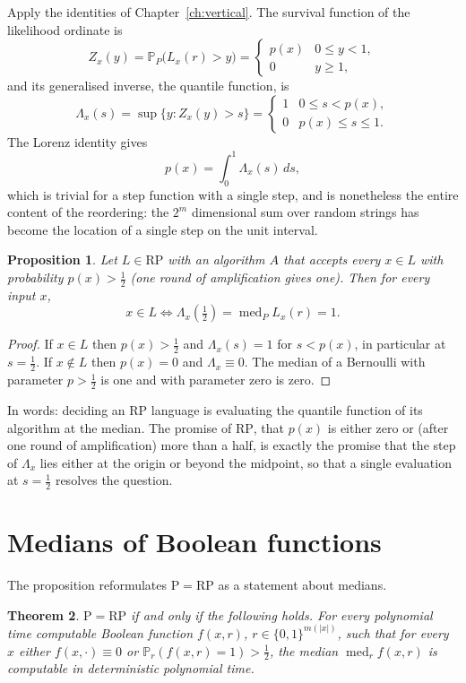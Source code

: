 \documentclass[11pt,twoside,openany]{book}
\theoremstyle{plain}
\newtheorem{theorem}{Theorem}[chapter]
\newtheorem{proposition}[theorem]{Proposition}
\theoremstyle{definition}
\theoremstyle{remark}
\newcommand{\PP}{\mathbb{P}}
\newcommand{\RP}{\mathrm{RP}}
\newcommand{\Pc}{\mathrm{P}}
\begin{document}
Apply the identities of Chapter~\ref{ch:vertical}. The survival function of the likelihood ordinate is
\[
Z_x(y) = \PP_P\big( L_x(r) > y \big) =
\begin{cases}
p(x) & 0 \le y < 1, \\
0 & y \ge 1,
\end{cases}
\]
and its generalised inverse, the quantile function, is
\[
\Lambda_x(s) = \sup\{ y : Z_x(y) > s \} =
\begin{cases}
1 & 0 \le s < p(x), \\
0 & p(x) \le s \le 1 .
\end{cases}
\]
The Lorenz identity gives
\[
p(x) = \int_0^1 \Lambda_x(s) \, ds ,
\]
which is trivial for a step function with a single step, and is nonetheless the entire content of the reordering: the $2^m$ dimensional sum over random strings has become the location of a single step on the unit interval.

\begin{proposition}
\label{prop:median}
Let $L \in \RP$ with an algorithm $A$ that accepts every $x \in L$ with probability $p(x) > \tfrac12$ (one round of amplification gives one). Then for every input $x$,
\[
x \in L \iff \Lambda_x(\tfrac12) = \operatorname{med}_P L_x(r) = 1 .
\]
\end{proposition}

\begin{proof}
If $x \in L$ then $p(x) > \tfrac12$ and $\Lambda_x(s) = 1$ for $s < p(x)$, in particular at $s = \tfrac12$. If $x \notin L$ then $p(x) = 0$ and $\Lambda_x \equiv 0$. The median of a Bernoulli with parameter $p > \tfrac12$ is one and with parameter zero is zero.
\end{proof}

In words: deciding an $\RP$ language is evaluating the quantile function of its algorithm at the median. The promise of $\RP$, that $p(x)$ is either zero or (after one round of amplification) more than a half, is exactly the promise that the step of $\Lambda_x$ lies either at the origin or beyond the midpoint, so that a single evaluation at $s = \tfrac12$ resolves the question.

\section{Medians of Boolean functions}

The proposition reformulates $\Pc = \RP$ as a statement about medians.

\begin{theorem}
\label{thm:medians}
$\Pc = \RP$ if and only if the following holds. For every polynomial time computable Boolean function $f(x, r)$, $r \in \{0,1\}^{m(|x|)}$, such that for every $x$ either $f(x, \cdot) \equiv 0$ or $\PP_r(f(x, r) = 1) > \tfrac12$, the median $\operatorname{med}_r f(x, r)$ is computable in deterministic polynomial time.
\end{theorem}
\end{document}
